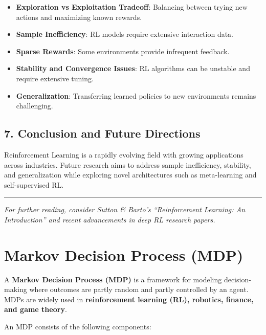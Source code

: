 \documentclass[
]{book}
\providecommand{\tightlist}{%
  \setlength{\itemsep}{0pt}\setlength{\parskip}{0pt}}
\begin{document}
\begin{itemize}
\tightlist
\item
  \textbf{Exploration vs Exploitation Tradeoff}: Balancing between trying new actions and maximizing known rewards.
\item
  \textbf{Sample Inefficiency}: RL models require extensive interaction data.
\item
  \textbf{Sparse Rewards}: Some environments provide infrequent feedback.
\item
  \textbf{Stability and Convergence Issues}: RL algorithms can be unstable and require extensive tuning.
\item
  \textbf{Generalization}: Transferring learned policies to new environments remains challenging.
\end{itemize}

\section{\texorpdfstring{\textbf{7. Conclusion and Future Directions}}{7. Conclusion and Future Directions}}\label{conclusion-and-future-directions}

Reinforcement Learning is a rapidly evolving field with growing applications across industries. Future research aims to address sample inefficiency, stability, and generalization while exploring novel architectures such as meta-learning and self-supervised RL.

\begin{center}\rule{0.5\linewidth}{0.5pt}\end{center}

\emph{For further reading, consider Sutton \& Barto's ``Reinforcement Learning: An Introduction'' and recent advancements in deep RL research papers.}

\chapter{\texorpdfstring{\textbf{Markov Decision Process (MDP)}}{Markov Decision Process (MDP)}}\label{markov-decision-process-mdp}

A \textbf{Markov Decision Process (MDP)} is a framework for modeling decision-making where outcomes are partly random and partly controlled by an agent. MDPs are widely used in \textbf{reinforcement learning (RL), robotics, finance, and game theory}.

An MDP consists of the following components:
\end{document}
